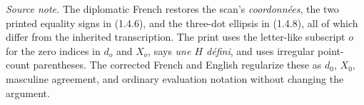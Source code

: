\medskip
\noindent\emph{Source note.}
The diplomatic French restores the scan's \emph{coordonnées}, the two
printed equality signs in (1.4.6), and the three-dot ellipsis in (1.4.8),
all of which differ from the inherited transcription.  The print uses the
letter-like subscript $o$ for the zero indices in $d_o$ and $X_o$, says
\emph{une $H$ défini}, and uses irregular point-count parentheses.  The
corrected French and English regularize these as $d_0$, $X_0$, masculine
agreement, and ordinary evaluation notation without changing the argument.
